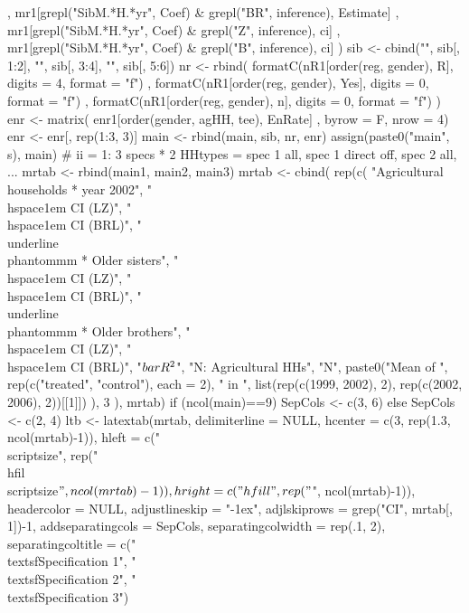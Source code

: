 \begin{Schunk}
\begin{Sinput}
{     ,
     mr1[grepl("SibM.*H.*yr", Coef) & grepl("BR", inference), Estimate]
     , 
     mr1[grepl("SibM.*H.*yr", Coef) & grepl("Z", inference), ci]
     ,
     mr1[grepl("SibM.*H.*yr", Coef) & grepl("B", inference), ci]
   )
   sib <- cbind("", sib[, 1:2], "", sib[, 3:4], "", sib[, 5:6])
   nr <- rbind(
      formatC(nR1[order(reg, gender), R], digits = 4, format = "f")
    , formatC(nR1[order(reg, gender), Yes], digits = 0, format = "f")
    , formatC(nR1[order(reg, gender), n], digits = 0, format = "f")
   )
   enr <- matrix(
     enr1[order(gender, agHH, tee), EnRate]
     , byrow = F, nrow = 4)
   enr <- enr[, rep(1:3, 3)]
   main <- rbind(main, sib, nr, enr)
   assign(paste0("main", s), main)
}
# ii = 1: 3 specs * 2 HHtypes = spec 1 all, spec 1 direct off, spec 2 all, ...
mrtab <- rbind(main1, main2, main3)
mrtab <- 
  cbind(
      rep(c(
        "Agricultural households * year 2002", 
        "\\hspace{1em} CI (LZ)", "\\hspace{1em} CI (BRL)", 
        "\\underline{\\phantom{mm}} * Older sisters",
        "\\hspace{1em} CI (LZ)", "\\hspace{1em} CI (BRL)", 
        "\\underline{\\phantom{mm}} * Older brothers",
        "\\hspace{1em} CI (LZ)", "\\hspace{1em} CI (BRL)", 
        "$\\bar{R}^{2}$", "N: Agricultural HHs", "N",
        paste0("Mean of ", rep(c("treated", "control"), each = 2), " in ", 
          list(rep(c(1999, 2002), 2), rep(c(2002, 2006), 2))[[1]])
         ), 3
      ), 
   mrtab)
if (ncol(main)==9) SepCols <- c(3, 6) else SepCols <- c(2, 4) 
ltb <- latextab(mrtab, delimiterline = NULL, 
    hcenter = c(3, rep(1.3, ncol(mrtab)-1)),
    hleft = c("\\scriptsize", rep("\\hfil\\scriptsize$", ncol(mrtab)-1)), 
    hright = c("\\hfill", rep("$", ncol(mrtab)-1)),
    headercolor = NULL, 
    adjustlineskip = "-1ex", adjlskiprows = grep("CI", mrtab[, 1])-1,
    addseparatingcols = SepCols, separatingcolwidth = rep(.1, 2), 
    separatingcoltitle = c("\\textsf{Specification 1}", "\\textsf{Specification 2}", "\\textsf{Specification 3}")

\end{Sinput}
\end{Schunk}
